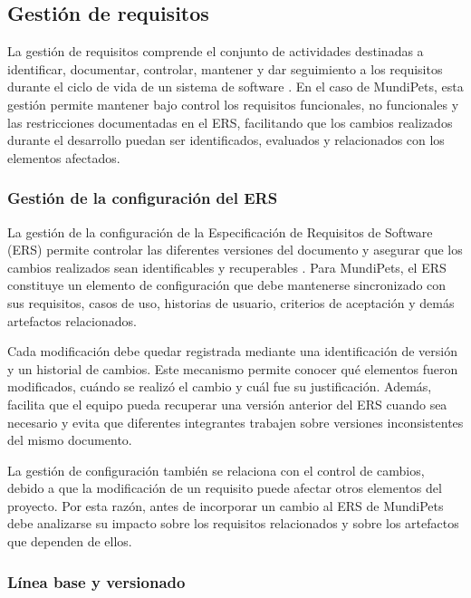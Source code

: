 \documentclass[journal,onecolumn]{IEEEtran}
\begin{document}
	\subsection{Gestión de requisitos}
	
	La gestión de requisitos comprende el conjunto de actividades destinadas a identificar,
	documentar, controlar, mantener y dar seguimiento a los requisitos durante el ciclo de vida de un
	sistema de software \cite{iso29148}. En el caso de MundiPets, esta gestión permite mantener bajo
	control los requisitos funcionales, no funcionales y las restricciones documentadas en el ERS,
	facilitando que los cambios realizados durante el desarrollo puedan ser identificados, evaluados y
	relacionados con los elementos afectados.
	
	\subsubsection{Gestión de la configuración del ERS}
	
	La gestión de la configuración de la Especificación de Requisitos de Software (ERS) permite
	controlar las diferentes versiones del documento y asegurar que los cambios realizados sean
	identificables y recuperables \cite{iso12207}. Para MundiPets, el ERS constituye un elemento de
	configuración que debe mantenerse sincronizado con sus requisitos, casos de uso, historias de
	usuario, criterios de aceptación y demás artefactos relacionados.
	
	Cada modificación debe quedar registrada mediante una identificación de versión y un historial de
	cambios. Este mecanismo permite conocer qué elementos fueron modificados, cuándo se realizó el
	cambio y cuál fue su justificación. Además, facilita que el equipo pueda recuperar una versión
	anterior del ERS cuando sea necesario y evita que diferentes integrantes trabajen sobre versiones
	inconsistentes del mismo documento.
	
	La gestión de configuración también se relaciona con el control de cambios, debido a que la
	modificación de un requisito puede afectar otros elementos del proyecto. Por esta razón, antes de
	incorporar un cambio al ERS de MundiPets debe analizarse su impacto sobre los requisitos
	relacionados y sobre los artefactos que dependen de ellos.
	
	\subsubsection{Línea base y versionado}
	
\end{document}
